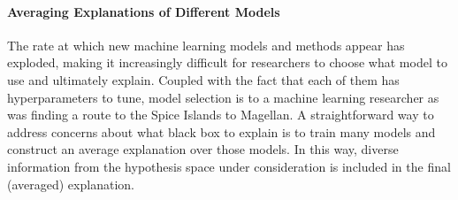 \documentclass[12pt]{article}  %
\begin{document}
\vspace{-3mm}    \paragraph{Averaging Explanations of Different Models}
      The rate at which new machine learning models and methods appear has exploded, making it increasingly difficult for researchers to choose what model to use and ultimately explain. Coupled with the fact that each of them has hyperparameters to tune, model selection is to a machine learning researcher as was finding a route to the Spice Islands to Magellan. A straightforward way to address concerns about what black box to explain is to train many models and construct an average explanation over those models. In this way, diverse information from the hypothesis space under consideration is included in the final (averaged) explanation.%
      
      
       
\end{document}
